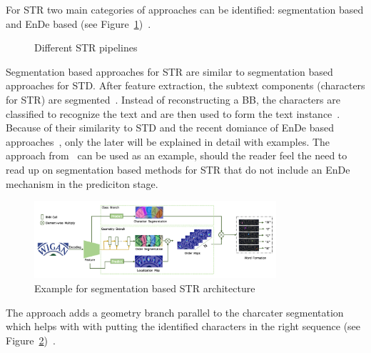 For \ac{STR} two main categories of approaches can be identified: segmentation based and
\ac{EnDe} based (see Figure~\ref{fig:str-pipelines})~\citep{chen_text_2021}.
\begin{figure}[h]
    \centering
    
    \caption{Different STR pipelines\label{fig:str-pipelines}}
\end{figure}
Segmentation based approaches for \ac{STR} are similar to segmentation based approaches for \ac{STD}.
After feature extraction, the subtext components (characters for \ac{STR}) are
segmented~\citep{chen_text_2021}.
Instead of reconstructing a \ac{BB}, the characters are classified to recognize the
text and are then used to form the text instance~\citep{chen_text_2021}.
Because of their similarity to \ac{STD} and the recent domiance of \ac{EnDe} based
approaches~\citep{chen_text_2021,long_scene_2021}, only the later will be explained in detail with
examples.
The approach from~\cite{wan_textscanner_2020} can be used as an example, should the reader feel the
need to read up on segmentation based methods for \ac{STR} that do not include an \ac{EnDe}
mechanism in the prediciton stage.
\begin{figure}[h]
    \centering
    \includegraphics[width=0.8\textwidth]{img/STR-seg-based-wan-textscaner-2020.png}
    \caption[Segmentation based STR architecture]{%
        Example for segmentation based STR
        architecture~\citep{wan_textscanner_2020}\label{fig:STR-segbased-architecture}
    }
\end{figure}
The approach adds a geometry branch parallel to the charcater segmentation which helps with with
putting the identified characters in the right sequence (see
Figure~\ref{fig:STR-segbased-architecture})~\citep{wan_textscanner_2020}.

